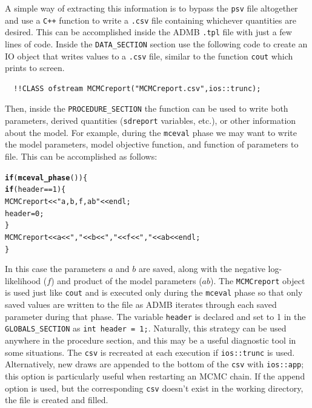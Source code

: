 \documentclass{article}\usepackage[]{graphicx}\usepackage[]{color}
\makeatletter
\newcommand{\hlstr}[1]{\textcolor[rgb]{0.192,0.494,0.8}{#1}}%
\newcommand{\hlkwd}[1]{\textcolor[rgb]{0.737,0.353,0.396}{\textbf{#1}}}%
\newenvironment{kframe}{%
 \def\at@end@of@kframe{}%
 \ifinner\ifhmode%
  \def\at@end@of@kframe{\end{minipage}}%
  \begin{minipage}{\columnwidth}%
 \fi\fi%
 \def\FrameCommand##1{\hskip\@totalleftmargin \hskip-\fboxsep
 \colorbox{shadecolor}{##1}\hskip-\fboxsep
     \hskip-\linewidth \hskip-\@totalleftmargin \hskip\columnwidth}%
 \MakeFramed {\advance\hsize-\width
   \@totalleftmargin\z@ \linewidth\hsize
   \@setminipage}}%
 {\par\unskip\endMakeFramed%
 \at@end@of@kframe}
\newenvironment{knitrout}{}{} %
\makeatother
\begin{document}
A simple way of extracting this information is to bypass the
\texttt{psv} file altogether and use a \texttt{C++} function
to write a \texttt{.csv} file containing whichever quantities
are desired. This can be accomplished inside the ADMB
\texttt{.tpl} file with just a few lines of code. Inside the
\texttt{DATA\_SECTION} section use the following code to
create an IO object that writes values to a \texttt{.csv}
file, similar to the function \texttt{cout} which prints to
screen.
\begin{verbatim}
  !!CLASS ofstream MCMCreport("MCMCreport.csv",ios::trunc);
\end{verbatim}
Then, inside the \texttt{PROCEDURE\_SECTION} the function can be used to
write both parameters, derived quantities (\texttt{sdreport} variables,
etc.), or other information about the model. For example, during the
\texttt{mceval} phase we may want to write the model parameters, model
objective function, and function of parameters to file. This can be
accomplished as follows:
\begin{knitrout}
\color{fgcolor}\begin{kframe}
\begin{alltt}
  \hlkwd{if}(\hlkwd{mceval_phase}())\{
    \hlkwd{if}(header==1) \{
        MCMCreport << \hlstr{"a,b,f,ab"} << endl;
        header=0;
    \}
    MCMCreport << a <<\hlstr{","} << b << \hlstr{","} << f << \hlstr{","} << ab << endl;
  \}
\end{alltt}
\end{kframe}
\end{knitrout}

In this case the parameters $a$ and $b$ are saved, along
with the negative log-likelihood ($f$) and product of the
model parameters ($ab$).  The \texttt{MCMCreport} object is
used just like \texttt{cout} and is executed only during the
\texttt{mceval} phase so that only saved values are written
to the file as ADMB iterates through each saved parameter
during that phase. The variable \texttt{header} is declared
and set to 1 in the \texttt{GLOBALS\_SECTION} as \texttt{int
  header = 1;}. Naturally, this strategy can be used
anywhere in the procedure section, and this may be a useful
diagnostic tool in some situations. The \texttt{csv} is
recreated at each execution if \texttt{ios::trunc} is
used. Alternatively, new draws are appended to the bottom of
the \texttt{csv} with \texttt{ios::app}; this option is
particularly useful when restarting an MCMC chain. If the
append option is used, but the corresponding \texttt{csv}
doesn't exist in the working directory, the file is created
and filled.
\end{document}
